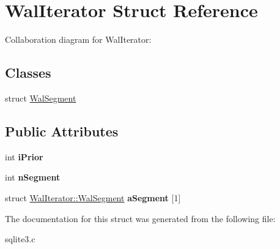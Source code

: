 \hypertarget{structWalIterator}{}\section{Wal\+Iterator Struct Reference}
\label{structWalIterator}


Collaboration diagram for Wal\+Iterator\+:
\subsection*{Classes}
\begin{DoxyCompactItemize}
\item 
struct \hyperlink{structWalIterator_1_1WalSegment}{Wal\+Segment}
\end{DoxyCompactItemize}
\subsection*{Public Attributes}
\begin{DoxyCompactItemize}
\item 
int {\bfseries i\+Prior}\hypertarget{structWalIterator_a2f906125490dd3e967fc53768b03abbb}{}\label{structWalIterator_a2f906125490dd3e967fc53768b03abbb}

\item 
int {\bfseries n\+Segment}\hypertarget{structWalIterator_ad81bc9447d6043212289d127dc9fdafa}{}\label{structWalIterator_ad81bc9447d6043212289d127dc9fdafa}

\item 
struct \hyperlink{structWalIterator_1_1WalSegment}{Wal\+Iterator\+::\+Wal\+Segment} {\bfseries a\+Segment} \mbox{[}1\mbox{]}\hypertarget{structWalIterator_a6d3fcaaeeca5a0eee46f9fa7c3cb669b}{}\label{structWalIterator_a6d3fcaaeeca5a0eee46f9fa7c3cb669b}

\end{DoxyCompactItemize}


The documentation for this struct was generated from the following file\+:\begin{DoxyCompactItemize}
\item 
sqlite3.\+c\end{DoxyCompactItemize}
